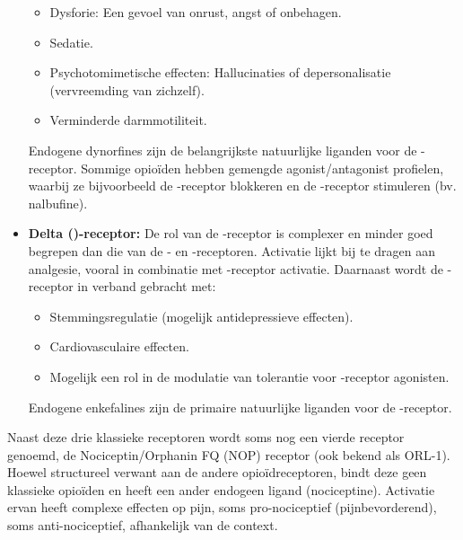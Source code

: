 \documentclass[11pt, a4paper]{report} %
\begin{document}
\begin{itemize}
        \begin{itemize}
            \item Dysforie: Een gevoel van onrust, angst of onbehagen.
            \item Sedatie.
            \item Psychotomimetische effecten: Hallucinaties of depersonalisatie (vervreemding van zichzelf).
            \item Verminderde darmmotiliteit.
        \end{itemize}
        Endogene dynorfines zijn de belangrijkste natuurlijke liganden voor de \textkappa-receptor. Sommige opioïden hebben gemengde agonist/antagonist profielen, waarbij ze bijvoorbeeld de \textmu-receptor blokkeren en de \textkappa-receptor stimuleren (bv. nalbufine).
    \item \textbf{Delta (\textdelta)-receptor:} De rol van de \textdelta-receptor is complexer en minder goed begrepen dan die van de \textmu- en \textkappa-receptoren. Activatie lijkt bij te dragen aan analgesie, vooral in combinatie met \textmu-receptor activatie. Daarnaast wordt de \textdelta-receptor in verband gebracht met:
        \begin{itemize}
            \item Stemmingsregulatie (mogelijk antidepressieve effecten).
            \item Cardiovasculaire effecten.
            \item Mogelijk een rol in de modulatie van tolerantie voor \textmu-receptor agonisten.
        \end{itemize}
        Endogene enkefalines zijn de primaire natuurlijke liganden voor de \textdelta-receptor.
\end{itemize}
Naast deze drie klassieke receptoren wordt soms nog een vierde receptor genoemd, de Nociceptin/Orphanin FQ (NOP) receptor (ook bekend als ORL-1). Hoewel structureel verwant aan de andere opioïdreceptoren, bindt deze geen klassieke opioïden en heeft een ander endogeen ligand (nociceptine). Activatie ervan heeft complexe effecten op pijn, soms pro-nociceptief (pijnbevorderend), soms anti-nociceptief, afhankelijk van de context.
\end{document}
